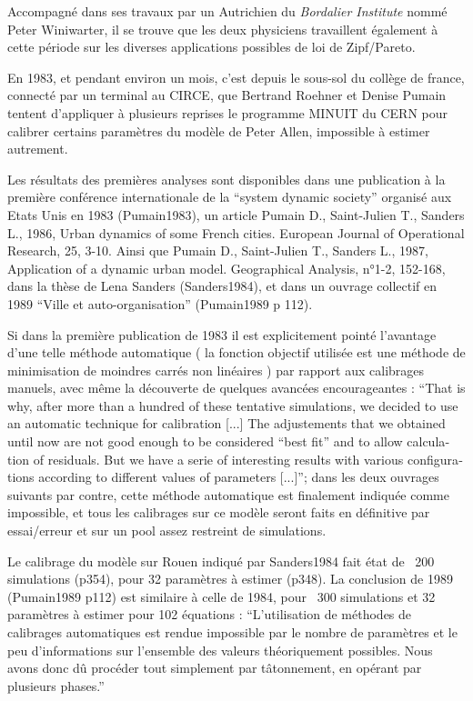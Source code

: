 Accompagné dans ses travaux par un Autrichien du \textit{Bordalier Institute} nommé Peter Winiwarter, il se trouve que les deux physiciens travaillent également à cette période sur les diverses applications possibles de loi de Zipf/Pareto.

En 1983, et pendant environ un mois, c’est depuis le sous-sol du collège de france, connecté par un terminal au CIRCE, que Bertrand Roehner et Denise Pumain tentent d’appliquer à plusieurs reprises le programme MINUIT du CERN pour calibrer certains paramètres du modèle de Peter Allen, impossible à estimer autrement.

Les résultats des premières analyses sont disponibles dans une publication à la première conférence internationale de la “system dynamic society” organisé aux Etats Unis en 1983 (Pumain1983), un article Pumain D., Saint-Julien T., Sanders L., 1986, Urban dynamics of some French cities. European Journal of Operational Research, 25, 3-10. Ainsi que Pumain D., Saint-Julien T., Sanders L., 1987, Application of a dynamic urban model. Geographical Analysis, n°1-2, 152-168, dans la thèse de Lena Sanders (Sanders1984), et dans un ouvrage collectif en 1989 “Ville et auto-organisation” (Pumain1989 p 112).

Si dans la première publication de 1983 il est explicitement pointé l’avantage d’une telle méthode automatique ( la fonction objectif utilisée est une méthode de minimisation de moindres carrés non linéaires ) par rapport aux calibrages manuels, avec même la découverte de quelques avancées encourageantes : \foreignquote{english}{That is why, after more than a hundred of these tentative simulations, we decided to use an automatic technique for calibration [...] The adjustements that we obtained until now are not good enough to be considered “best fit” and to allow calculation of residuals. But we have a serie of interesting results with various configurations according to different values of parameters [...]}; dans les deux ouvrages suivants par contre, cette méthode automatique est finalement indiquée comme impossible, et tous les calibrages sur ce modèle seront faits en définitive par essai/erreur et sur un pool assez restreint de simulations.

Le calibrage du modèle sur Rouen indiqué par Sanders1984 fait état de ~200 simulations (p354), pour 32 paramètres à estimer (p348). La conclusion de 1989 (Pumain1989 p112) est similaire à celle de 1984, pour ~300 simulations et 32 paramètres à estimer pour 102 équations : \enquote{L’utilisation de méthodes de calibrages automatiques est rendue impossible par le nombre de paramètres et le peu d’informations sur l’ensemble des valeurs théoriquement possibles. Nous avons donc dû procéder tout simplement par tâtonnement, en opérant par plusieurs phases.}

